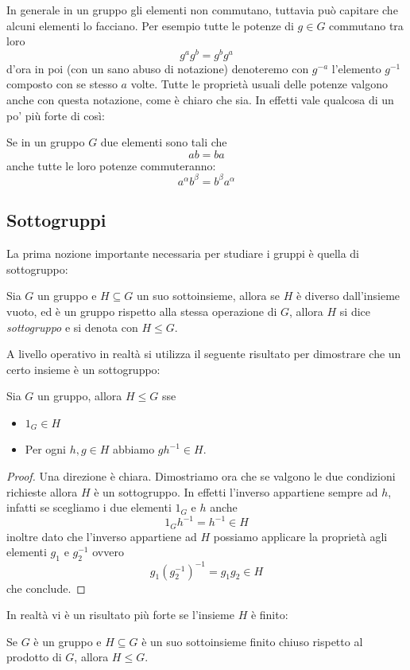 \documentclass[11pt]{scrartcl}
\begin{document}
	In generale in un gruppo gli elementi non commutano, tuttavia può capitare che alcuni elementi lo facciano. Per esempio tutte le potenze di $g\in G$ commutano tra loro
	$$g^ag^b=g^bg^a$$ 
	d'ora in poi (con un sano abuso di notazione) denoteremo con $g^{-a}$ l'elemento $g^{-1}$ composto con se stesso $a$ volte. Tutte le proprietà usuali delle potenze valgono anche con questa notazione, come è chiaro che sia. In effetti vale qualcosa di un po' più forte di così:
	\begin{remark}
		Se in un gruppo $G$ due elementi sono tali che 
		$$ab=ba$$
		anche tutte le loro potenze commuteranno:
		$$a^\alpha b^\beta = b^\beta a^\alpha$$ 
	\end{remark}
	
	\subsection{Sottogruppi}
	La prima nozione importante necessaria per studiare i gruppi è quella di sottogruppo:
	\begin{definition}[Sottogruppo]
		Sia $G$ un gruppo e $H\subseteq G$ un suo sottoinsieme, allora se $H$ è diverso dall'insieme vuoto, ed è un gruppo rispetto alla stessa operazione di $G$, allora $H$ si dice \textit{sottogruppo} e si denota con $H\le G$. 
	\end{definition}
	A livello operativo in realtà si utilizza il seguente risultato per dimostrare che un certo insieme è un sottogruppo:
	\begin{lemma}\label{equivalente di sottogruppo}
		Sia $G$ un gruppo, allora $H\le G$ sse 
		\begin{itemize}
			\item $1_G\in H$
			\item Per ogni $h,g\in H$ abbiamo $gh^{-1}\in H$.
		\end{itemize}
	\end{lemma}
	\begin{proof}
		Una direzione è chiara. Dimostriamo ora che se valgono le due condizioni richieste allora $H$ è un sottogruppo. In effetti l'inverso appartiene sempre ad $h$, infatti se scegliamo i due elementi $1_G$ e $h$ anche 
		$$1_G h^{-1}=h^{-1}\in H$$
		inoltre dato che l'inverso appartiene ad $H$ possiamo applicare la proprietà agli elementi $g_1$ e $g_2^{-1}$ ovvero
		$$g_1(g_2^{-1})^{-1}=g_1g_2\in H$$
		che conclude.
	\end{proof}
	In realtà vi è un risultato più forte se l'insieme $H$ è finito:
	\begin{lemma}
		Se $G$ è un gruppo e $H\subseteq G$ è un suo sottoinsieme finito chiuso rispetto al prodotto di $G$, allora $H\le G$.
	\end{lemma}
\end{document}
